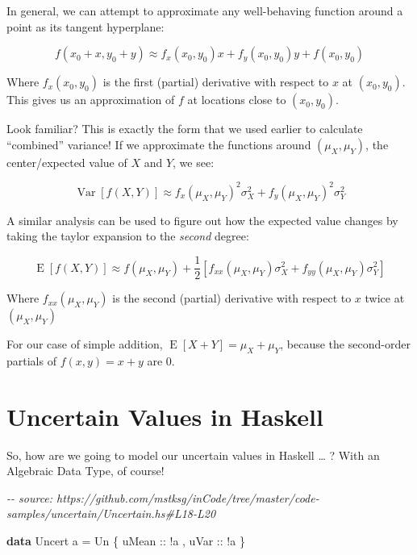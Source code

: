 \documentclass[]{article}
\newenvironment{Shaded}{}{}
\newcommand{\CommentTok}[1]{\textcolor[rgb]{0.38,0.63,0.69}{\textit{#1}}}
\newcommand{\DataTypeTok}[1]{\textcolor[rgb]{0.56,0.13,0.00}{#1}}
\newcommand{\KeywordTok}[1]{\textcolor[rgb]{0.00,0.44,0.13}{\textbf{#1}}}
\newcommand{\NormalTok}[1]{#1}
\newcommand{\OperatorTok}[1]{\textcolor[rgb]{0.40,0.40,0.40}{#1}}
\newcommand{\OtherTok}[1]{\textcolor[rgb]{0.00,0.44,0.13}{#1}}
\begin{document}
In general, we can attempt to approximate any well-behaving function around a
point as its tangent hyperplane:

\[
f(x_0 + x, y_0 + y) \approx f_x(x_0, y_0) x + f_y(x_0, y_0) y + f(x_0, y_0)
\]

Where \(f_x(x_0,y_0)\) is the first (partial) derivative with respect to \(x\)
at \((x_0, y_0)\). This gives us an approximation of \(f\) at locations close to
\((x_0, y_0)\).

Look familiar? This is exactly the form that we used earlier to calculate
``combined'' variance! If we approximate the functions around
\((\mu_X, \mu_Y)\), the center/expected value of \(X\) and \(Y\), we see:

\[
\operatorname{Var}[f(X,Y)] \approx f_x(\mu_X, \mu_Y)^2 \sigma_X^2 + f_y(\mu_X,\mu_Y)^2 \sigma_Y^2
\]

A similar analysis can be used to figure out how the expected value changes by
taking the taylor expansion to the \emph{second} degree:

\[
\operatorname{E}[f(X,Y)] \approx
f(\mu_X, \mu_Y) + \frac{1}{2}
\left[ f_{xx}(\mu_X, \mu_Y) \sigma_X^2 + f_{yy}(\mu_X, \mu_Y) \sigma_Y^2 \right]
\]

Where \(f_{xx}(\mu_X, \mu_Y)\) is the second (partial) derivative with respect
to \(x\) twice at \((\mu_X, \mu_Y)\)

For our case of simple addition, \(\operatorname{E}[X + Y] = \mu_X + \mu_Y\),
because the second-order partials of \(f(x,y) = x + y\) are 0.

\hypertarget{uncertain-values-in-haskell}{%
\section{Uncertain Values in Haskell}\label{uncertain-values-in-haskell}}

So, how are we going to model our uncertain values in Haskell \ldots{} ? With an
Algebraic Data Type, of course!

\begin{Shaded}
\begin{Highlighting}[]
\CommentTok{{-}{-} source: https://github.com/mstksg/inCode/tree/master/code{-}samples/uncertain/Uncertain.hs\#L18{-}L20}

\KeywordTok{data} \DataTypeTok{Uncert}\NormalTok{ a }\OtherTok{=} \DataTypeTok{Un}\NormalTok{ \{}\OtherTok{ uMean ::} \OperatorTok{!}\NormalTok{a}
\NormalTok{                   ,}\OtherTok{ uVar  ::} \OperatorTok{!}\NormalTok{a}
\NormalTok{                   \}}
\end{Highlighting}
\end{Shaded}
\end{document}
